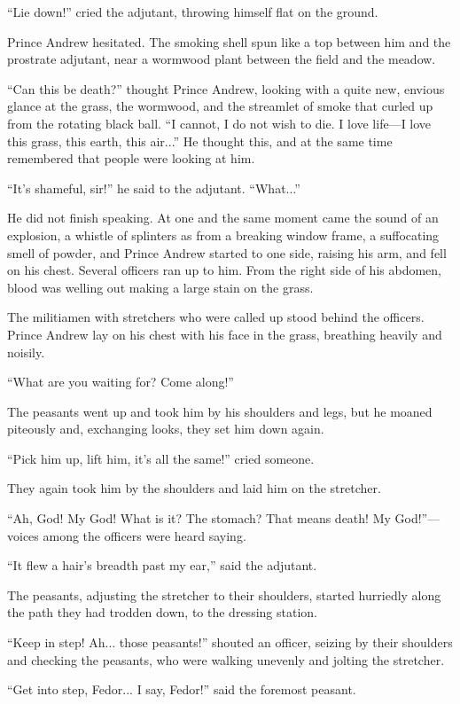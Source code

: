 ``Lie down!'' cried the adjutant, throwing himself flat on the
ground.

Prince Andrew hesitated. The smoking shell spun like a top
between him and the prostrate adjutant, near a wormwood plant
between the field and the meadow.

``Can this be death?'' thought Prince Andrew, looking with a
quite new, envious glance at the grass, the wormwood, and the
streamlet of smoke that curled up from the rotating black
ball. ``I cannot, I do not wish to die. I love life---I love this
grass, this earth, this air...'' He thought this, and at the same
time remembered that people were looking at him.

``It's shameful, sir!'' he said to the adjutant. ``What...''

He did not finish speaking. At one and the same moment came the
sound of an explosion, a whistle of splinters as from a breaking
window frame, a suffocating smell of powder, and Prince Andrew
started to one side, raising his arm, and fell on his
chest. Several officers ran up to him.  From the right side of
his abdomen, blood was welling out making a large stain on the
grass.

The militiamen with stretchers who were called up stood behind
the officers. Prince Andrew lay on his chest with his face in the
grass, breathing heavily and noisily.

``What are you waiting for? Come along!''

The peasants went up and took him by his shoulders and legs, but
he moaned piteously and, exchanging looks, they set him down
again.

``Pick him up, lift him, it's all the same!'' cried someone.

They again took him by the shoulders and laid him on the
stretcher.

``Ah, God! My God! What is it? The stomach? That means death!  My
God!''---voices among the officers were heard saying.

``It flew a hair's breadth past my ear,'' said the adjutant.

The peasants, adjusting the stretcher to their shoulders, started
hurriedly along the path they had trodden down, to the dressing
station.

``Keep in step! Ah... those peasants!'' shouted an officer,
seizing by their shoulders and checking the peasants, who were
walking unevenly and jolting the stretcher.

``Get into step, Fedor... I say, Fedor!'' said the foremost
peasant.

